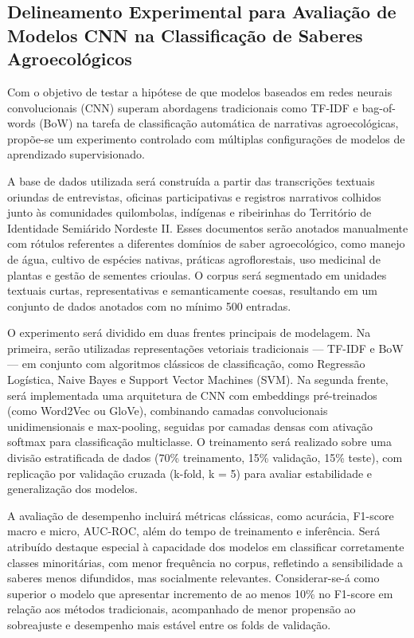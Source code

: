 \subsection{Delineamento Experimental para Avaliação de Modelos CNN na Classificação de Saberes Agroecológicos}

Com o objetivo de testar a hipótese de que modelos baseados em redes neurais convolucionais (CNN) superam abordagens tradicionais como TF-IDF e bag-of-words (BoW) na tarefa de classificação automática de narrativas agroecológicas, propõe-se um experimento controlado com múltiplas configurações de modelos de aprendizado supervisionado.

A base de dados utilizada será construída a partir das transcrições textuais oriundas de entrevistas, oficinas participativas e registros narrativos colhidos junto às comunidades quilombolas, indígenas e ribeirinhas do Território de Identidade Semiárido Nordeste II. Esses documentos serão anotados manualmente com rótulos referentes a diferentes domínios de saber agroecológico, como manejo de água, cultivo de espécies nativas, práticas agroflorestais, uso medicinal de plantas e gestão de sementes crioulas. O corpus será segmentado em unidades textuais curtas, representativas e semanticamente coesas, resultando em um conjunto de dados anotados com no mínimo 500 entradas.

O experimento será dividido em duas frentes principais de modelagem. Na primeira, serão utilizadas representações vetoriais tradicionais — TF-IDF e BoW — em conjunto com algoritmos clássicos de classificação, como Regressão Logística, Naive Bayes e Support Vector Machines (SVM). Na segunda frente, será implementada uma arquitetura de CNN com embeddings pré-treinados (como Word2Vec ou GloVe), combinando camadas convolucionais unidimensionais e max-pooling, seguidas por camadas densas com ativação softmax para classificação multiclasse. O treinamento será realizado sobre uma divisão estratificada de dados (70\% treinamento, 15\% validação, 15\% teste), com replicação por validação cruzada (k-fold, k = 5) para avaliar estabilidade e generalização dos modelos.

A avaliação de desempenho incluirá métricas clássicas, como acurácia, F1-score macro e micro, AUC-ROC, além do tempo de treinamento e inferência. Será atribuído destaque especial à capacidade dos modelos em classificar corretamente classes minoritárias, com menor frequência no corpus, refletindo a sensibilidade a saberes menos difundidos, mas socialmente relevantes. Considerar-se-á como superior o modelo que apresentar incremento de ao menos 10\% no F1-score em relação aos métodos tradicionais, acompanhado de menor propensão ao sobreajuste e desempenho mais estável entre os folds de validação.

